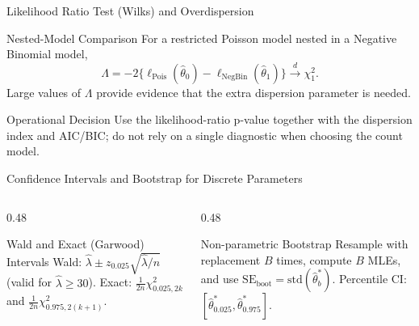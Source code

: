\documentclass[aspectratio=169,xcolor={dvipsnames,table}]{beamer}
\begin{document}
\begin{frame}{Likelihood Ratio Test (Wilks) and Overdispersion}
\vspace{-0.15cm}
\begin{block}{Nested-Model Comparison}
\footnotesize
For a restricted Poisson model nested in a Negative Binomial model,
\[
\Lambda=-2\{\ell_{\mathrm{Pois}}(\hat\theta_0)-\ell_{\mathrm{NegBin}}(\hat\theta_1)\}
\xrightarrow{d}\chi^2_{1}.
\]
Large values of $\Lambda$ provide evidence that the extra dispersion parameter
is needed.
\end{block}
\begin{alertblock}{Operational Decision}
\scriptsize
Use the likelihood-ratio p-value together with the dispersion index and AIC/BIC;
do not rely on a single diagnostic when choosing the count model.
\end{alertblock}
\end{frame}

\begin{frame}{Confidence Intervals and Bootstrap for Discrete Parameters}
	\vspace{-0.15cm}
	\begin{columns}[T]
		\begin{column}{0.48\textwidth}
			\begin{block}{Wald and Exact (Garwood) Intervals}
				\footnotesize
				Wald: $\hat{\lambda} \pm z_{0.025}\sqrt{\hat{\lambda}/n}$ (valid for $\hat{\lambda} \ge 30$). Exact: $\frac{1}{2n}\chi^2_{0.025, 2k}$ and $\frac{1}{2n}\chi^2_{0.975, 2(k+1)}$.
			\end{block}
		\end{column}
		\begin{column}{0.48\textwidth}
			\begin{alertblock}{Non-parametric Bootstrap}
				\footnotesize
				Resample with replacement $B$ times, compute $B$ MLEs, and use $\text{SE}_{\text{boot}} = \text{std}(\hat{\theta}^{*}_b)$. Percentile CI: $[\hat{\theta}^{*}_{0.025}, \hat{\theta}^{*}_{0.975}]$.
			\end{alertblock}
		\end{column}
	\end{columns}
\end{frame}
\end{document}
